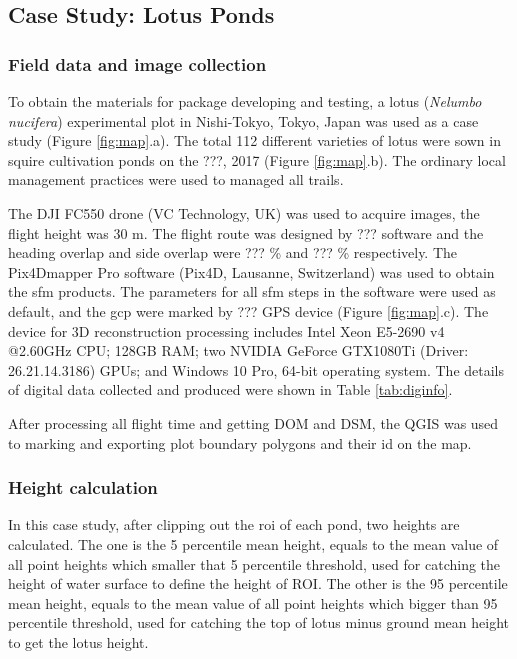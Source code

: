 \documentclass{configs/bmcart}
\begin{document}
\subsection*{Case Study: Lotus Ponds}

\subsubsection*{Field data and image collection}
To obtain the materials for package developing and testing, a lotus (\textit{Nelumbo nucifera}) experimental plot in Nishi-Tokyo, Tokyo, Japan was used as a case study (Figure \ref{fig:map}.a). The total 112 different varieties of lotus were sown in squire cultivation ponds on the ???, 2017 (Figure \ref{fig:map}.b). The ordinary local management practices were used to managed all trails.

The DJI FC550 drone (VC Technology, UK) was used to acquire images, the flight height was 30 m. The flight route was designed by ??? software and the heading overlap and side overlap were ??? \% and ??? \% respectively. The Pix4Dmapper Pro software (Pix4D, Lausanne, Switzerland) was used to obtain the \acrshort*{sfm} products. The parameters for all \acrshort*{sfm} steps in the software were used as default, and the \acrfull*{gcp} were marked by ??? GPS device (Figure \ref{fig:map}.c). The device for 3D reconstruction processing includes Intel Xeon E5-2690 v4 @2.60GHz CPU; 128GB RAM; two NVIDIA GeForce GTX1080Ti (Driver: 26.21.14.3186) GPUs; and Windows 10 Pro, 64-bit operating system. The details of digital data collected and produced were shown in Table \ref{tab:diginfo}.

After processing all flight time and getting DOM and DSM, the QGIS was used to marking and exporting plot boundary polygons and their id on the map.

\subsubsection*{Height calculation}
In this case study, after clipping out the \acrfull*{roi} of each pond, two heights are calculated. The one is the 5 percentile mean height, equals to the mean value of all point heights which smaller that 5 percentile threshold, used for catching the height of water surface to define the height of ROI. The other is the 95 percentile mean height, equals to the mean value of all point heights which bigger than 95 percentile threshold, used for catching the top of lotus minus ground mean height to get the lotus height.
\end{document}

